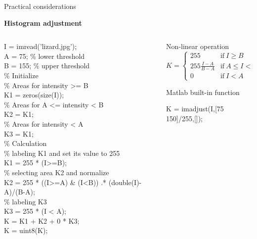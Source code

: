 %
%
\begin{slide}{Practical considerations}
\begin{bulletlist} %
\small
\item<2-> \textbf{Histogram adjustment}
\begin{columns}
\begin{column}{0.5\textwidth}
\begin{code}[7]{}
I = imread('lizard.jpg'); \\
A = 75;  \% lower threshold \\
B = 155; \% upper threshold \\

\% Initialize \\
\% Areas for intensity >= B \\
K1 = zeros(size(I)); \\
\% Areas for A <= intensity < B \\
K2 = K1; \\
\% Areas for intensity < A \\
K3 = K1; \\

\% Calculation \\
\% labeling K1 and set its value to 255 \\
K1 = 255 * (I>=B); \\
\% selecting area K2 and normalize \\
K2 = 255 * ((I>=A) \& (I<B)) .* (double(I)-A)/(B-A); \\
\% labeling K3 \\
K3 = 255 * (I < A); \\

K = K1 + K2 + 0 * K3; \\
K = uint8(K); \\

\end{code}
\end{column}
\begin{column}{0.5\textwidth}
Non-linear operation
\[ 
K = \begin{cases}
255 & \mbox{if}\ I \geq B \\
255 \frac{I-A}{B-A} & \mbox{if}\ A \leq I < B \\
0 & \mbox{if}\ I < A
\end{cases}
 \]
 
Matlab built-in function
\begin{code}[8]{}
K = imadjust(I,[75 150]/255,[]);
\end{code}
\end{column}
\end{columns}


%
%
%
%
%

\end{bulletlist}

\end{slide}


